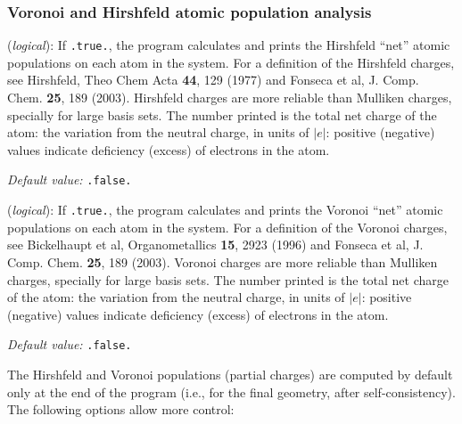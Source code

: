 \subsubsection{Voronoi and Hirshfeld atomic population analysis}
\begin{description}
\itemsep 10pt
\parsep 0pt

\item[\textbf{WriteHirshfeldPop}] (\textit{logical}): 
%
If \texttt{.true.}, the program calculates and prints the Hirshfeld
``net'' atomic populations on each atom in the system. For a
definition of the Hirshfeld charges, see Hirshfeld, Theo Chem Acta
\textbf{44}, 129 (1977) and Fonseca et al, J. Comp. Chem. \textbf{25},
189 (2003).  Hirshfeld charges are more reliable than Mulliken
charges, specially for large basis sets.  The number printed is the
total net charge of the atom: the variation from the neutral charge,
in units of $|e|$: positive (negative) values indicate deficiency
(excess) of electrons in the atom.

\textit{Default value:} \texttt{.false.} 


\item[\textbf{WriteVoronoiPop}] (\textit{logical}): 
%
If \texttt{.true.}, the program calculates and prints the Voronoi
``net'' atomic populations on each atom in the system. For a
definition of the Voronoi charges, see Bickelhaupt et al,
Organometallics \textbf{15}, 2923 (1996) and Fonseca et al,
J. Comp. Chem. \textbf{25}, 189 (2003).  Voronoi charges are more
reliable than Mulliken charges, specially for large basis sets.  The
number printed is the total net charge of the atom: the variation from
the neutral charge, in units of $|e|$: positive (negative) values
indicate deficiency (excess) of electrons in the atom.

\textit{Default value:} \texttt{.false.}

\end{description}

The Hirshfeld and Voronoi populations (partial charges) are computed
by default only at the end of the program (i.e., for the final
geometry, after self-consistency). The following options allow more control:

